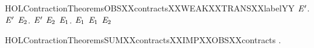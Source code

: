 \newcommand{\HOLContractionTheoremsOBSXXcontractsXXWEAKXXTRANSYY}{\UseVerbatim{HOLContractionTheoremsOBSXXcontractsXXWEAKXXTRANSYY}}
\begin{SaveVerbatim}{HOLContractionTheoremsOBSXXcontractsXXWEAKXXTRANSXXlabelYY}
\HOLTokenTurnstile{} \HOLSymConst{\HOLTokenForall{}} \ensuremath{\HOLBoundVar{E}\sp{\prime}}.
         \ensuremath{\HOLBoundVar{E}\sp{\prime}} \HOLSymConst{\HOLTokenImp{}}
       \HOLSymConst{\HOLTokenForall{}} \ensuremath{\HOLBoundVar{E}\sb{\mathrm{2}}}.
           \ensuremath{\HOLBoundVar{E}\sp{\prime}} \HOLTokenWeakTransBegin{} \HOLTokenWeakTransEnd \ensuremath{\HOLBoundVar{E}\sb{\mathrm{2}}} \HOLSymConst{\HOLTokenImp{}}
           \HOLSymConst{\HOLTokenExists{}}\ensuremath{\HOLBoundVar{E}\sb{\mathrm{1}}}.  \HOLTokenWeakTransBegin{} \HOLTokenWeakTransEnd \ensuremath{\HOLBoundVar{E}\sb{\mathrm{1}}} \HOLSymConst{\HOLTokenConj{}}  \ensuremath{\HOLBoundVar{E}\sb{\mathrm{1}}} \ensuremath{\HOLBoundVar{E}\sb{\mathrm{2}}}
\end{SaveVerbatim}
\newcommand{\HOLContractionTheoremsOBSXXcontractsXXWEAKXXTRANSXXlabelYY}{\UseVerbatim{HOLContractionTheoremsOBSXXcontractsXXWEAKXXTRANSXXlabelYY}}
\begin{SaveVerbatim}{HOLContractionTheoremsSUMXXcontractsXXIMPXXOBSXXcontracts}
\HOLTokenTurnstile{} \HOLSymConst{\HOLTokenForall{}} .
         \HOLSymConst{\HOLTokenConj{}}   \HOLSymConst{\HOLTokenImp{}}
          \HOLSymConst{\HOLTokenImp{}}
         
\end{SaveVerbatim}
\newcommand{\HOLContractionTheoremsSUMXXcontractsXXIMPXXOBSXXcontracts}{\UseVerbatim{HOLContractionTheoremsSUMXXcontractsXXIMPXXOBSXXcontracts}}
